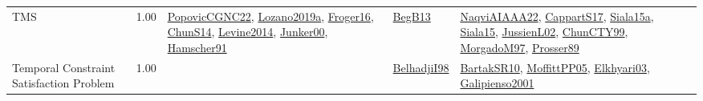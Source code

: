{\begin{longtable}{p{3cm}r>{\raggedright\arraybackslash}p{6cm}>{\raggedright\arraybackslash}p{6cm}>{\raggedright\arraybackslash}p{8cm}}
\index{TMS}\index{Classification!TMS}TMS &  1.00 & \hyperref[detail:PopovicCGNC22]{PopovicCGNC22}, \hyperref[detail:Lozano2019a]{Lozano2019a}, \hyperref[detail:Froger16]{Froger16}, \hyperref[detail:ChunS14]{ChunS14}, \hyperref[detail:Levine2014]{Levine2014}, \hyperref[detail:Junker00]{Junker00}, \hyperref[detail:Hamscher91]{Hamscher91} & \hyperref[detail:BegB13]{BegB13} & \hyperref[detail:NaqviAIAAA22]{NaqviAIAAA22}, \hyperref[detail:CappartS17]{CappartS17}, \hyperref[detail:Siala15a]{Siala15a}, \hyperref[detail:Siala15]{Siala15}, \hyperref[detail:JussienL02]{JussienL02}, \hyperref[detail:ChunCTY99]{ChunCTY99}, \hyperref[detail:MorgadoM97]{MorgadoM97}, \hyperref[detail:Prosser89]{Prosser89}\\
\index{Temporal Constraint Satisfaction Problem}\index{Classification!Temporal Constraint Satisfaction Problem}Temporal Constraint Satisfaction Problem &  1.00 &  & \hyperref[detail:BelhadjiI98]{BelhadjiI98} & \hyperref[detail:BartakSR10]{BartakSR10}, \hyperref[detail:MoffittPP05]{MoffittPP05}, \hyperref[detail:Elkhyari03]{Elkhyari03}, \hyperref[detail:Galipienso2001]{Galipienso2001}\\

\end{longtable}}
